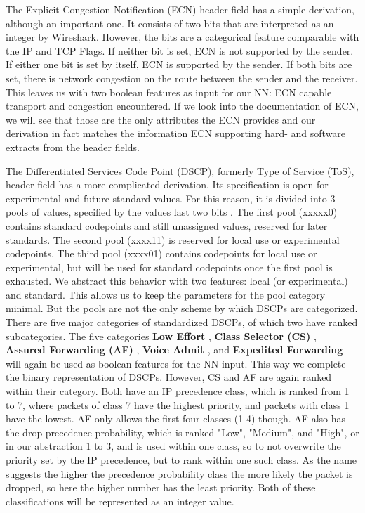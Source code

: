 \documentclass[
	ngerman,
	ruledheaders=section,%
	class=report,%
	thesis={type=bachelor},%
	accentcolor=9c,%
	custommargins=true,%
	marginpar=false,%
	parskip=half-,%
	fontsize=11pt,%
	twoside
]{tudapub}
\begin{document}
The Explicit Congestion Notification (ECN) \cite{floydAdditionExplicitCongestion} header field has a simple derivation, although an important one.
It consists of two bits that are interpreted as an integer by Wireshark.
However, the bits are a categorical feature comparable with the IP and TCP Flags.
If neither bit is set, ECN is not supported by the sender.
If either one bit is set by itself, ECN is supported by the sender.
If both bits are set, there is network congestion on the route between the sender and the receiver.
This leaves us with two boolean features as input for our NN: ECN capable transport and congestion encountered.
If we look into the documentation of ECN, we will see that those are the only attributes the ECN provides \cite{DifferentiatedServicesField} and our derivation in fact matches the information ECN supporting hard- and software extracts from the header fields.

The Differentiated Services Code Point (DSCP), formerly Type of Service (ToS), header field has a more complicated derivation.
Its specification is open for experimental and future standard values.
For this reason, it is divided into 3 pools of values, specified by the values last two bits \cite{DifferentiatedServicesField}.
The first pool (xxxxx0) contains standard codepoints and still unassigned values, reserved for later standards.
The second pool (xxxx11) is reserved for local use or experimental codepoints.
The third pool (xxxx01) contains codepoints for local use or experimental, but will be used for standard codepoints once the first pool is exhausted.
We abstract this behavior with two features: local (or experimental) and standard.
This allows us to keep the parameters for the pool category minimal.
But the pools are not the only scheme by which DSCPs are categorized.
There are five major categories of standardized DSCPs, of which two have ranked subcategories.
The five categories \textbf{Low Effort} \cite{blessLowerEffortPerHopBehavior}, \textbf{Class Selector (CS)} \cite{nicholsDefinitionDifferentiatedServices}, \textbf{Assured Forwarding (AF)} \cite{wroclawskiAssuredForwardingPHB}, \textbf{Voice Admit} \cite{bakerDifferentiatedServicesCode}, and \textbf{Expedited Forwarding} \cite{firoiuExpeditedForwardingPHB} will again be used as boolean features for the NN input.
This way we complete the binary representation of DSCPs.
However, CS and AF are again ranked within their category.
Both have an IP precedence class, which is ranked from 1 to 7, where packets of class 7 have the highest priority, and packets with class 1 have the lowest.
AF only allows the first four classes (1-4) though.
AF also has the drop precedence probability, which is ranked "Low", "Medium", and "High", or in our abstraction 1 to 3, and is used within one class, so to not overwrite the priority set by the IP precedence, but to rank within one such class.
As the name suggests the higher the precedence probability class the more likely the packet is dropped, so here the higher number has the least priority.
Both of these classifications will be represented as an integer value.
\end{document}
